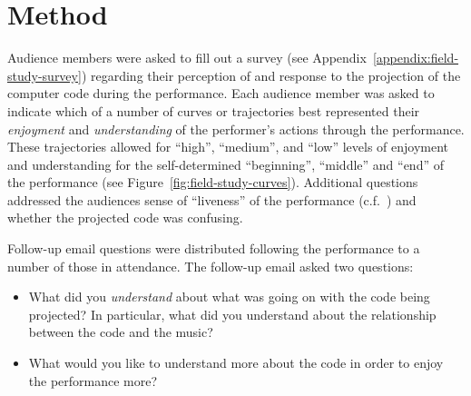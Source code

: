 \section{Method}

Audience members were asked to fill out a survey (see Appendix~\ref{appendix:field-study-survey}) regarding their perception of and response to the projection of the computer code during the performance. Each audience member was asked to indicate which of a number of curves or trajectories best represented their \emph{enjoyment} and \emph{understanding} of the performer's actions through the performance. These trajectories allowed for ``high'', ``medium'', and ``low'' levels of enjoyment and understanding for the self-determined ``beginning'', ``middle'' and ``end'' of the performance (see Figure~\ref{fig:field-study-curves}). Additional questions addressed the audiences sense of ``liveness'' of the performance (c.f.~\cite{Auslander}) and whether the projected code was confusing.

Follow-up email questions were distributed following the performance to a number of those in attendance. The follow-up email asked two questions: 
\begin{itemize}
\item What did you \emph{understand} about what was going on with the code being projected? In particular, what did you understand about the relationship between the code and the music? 
\item What would you like to understand more about the code in order to enjoy the performance more? 
\end{itemize}


